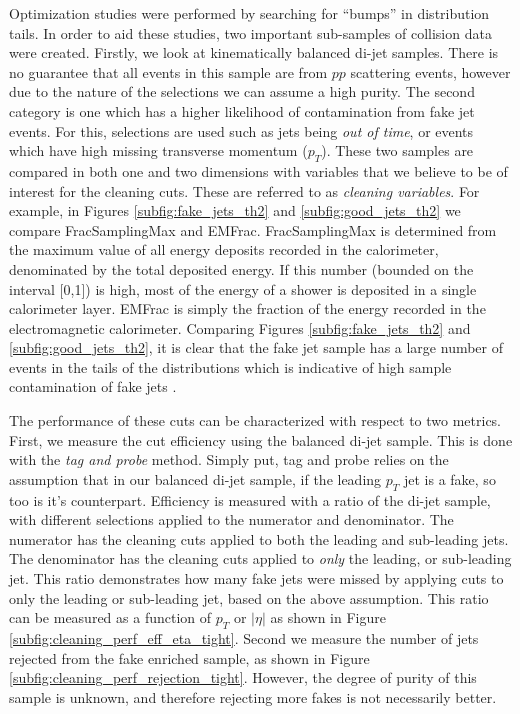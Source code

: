 \documentclass[12pt]{article}
\begin{document}
Optimization studies were performed by searching for ``bumps'' in distribution
tails. In order to aid these studies, two important sub-samples of collision
data were created. Firstly, we look at kinematically balanced di-jet samples.
There is no guarantee that all events in this sample are from $pp$ scattering
events, however due to the nature of the selections we can assume a high purity.
The second category is one which has a higher likelihood of contamination from
fake jet events. For this, selections are used such as jets being \textit{out of
time}, or events which have high missing transverse momentum ($p_T$). These two
samples are compared in both one and two dimensions with variables that we
believe to be of interest for the cleaning cuts. These are referred to as
\textit{cleaning variables}. For example, in Figures \ref{subfig:fake_jets_th2}
and \ref{subfig:good_jets_th2} we compare FracSamplingMax and EMFrac.
FracSamplingMax is determined from the maximum value of all energy deposits
recorded in the calorimeter, denominated by the total deposited energy. If this
number (bounded on the interval [0,1]) is high, most of the energy of a shower
is deposited in a single calorimeter layer. EMFrac is simply the fraction of the
energy recorded in the electromagnetic calorimeter. Comparing Figures
\ref{subfig:fake_jets_th2} and \ref{subfig:good_jets_th2}, it is clear that the
fake jet sample has a large number of events in the tails of the distributions
which is indicative of high sample contamination of fake jets
\cite{jet_cleaning_tancredi}.


The performance of these cuts can be characterized with respect to two metrics.
First, we measure the cut efficiency using the balanced di-jet sample. This is
done with the \textit{tag and probe} method. Simply put, tag and probe relies on
the assumption that in our balanced di-jet sample, if the leading $p_T$ jet is a
fake, so too is it's counterpart. Efficiency is measured with a ratio of the
di-jet sample, with different selections applied to the numerator and
denominator. The numerator has the cleaning cuts applied to both the leading and
sub-leading jets. The denominator has the cleaning cuts applied to \textit{only}
the leading, or sub-leading jet. This ratio demonstrates how many fake jets were
missed by applying cuts to only the leading or sub-leading jet, based on the
above assumption. This ratio can be measured as a function of $p_T$ or $|\eta|$
as shown in Figure \ref{subfig:cleaning_perf_eff_eta_tight}. Second we measure
the number of jets rejected from the fake enriched sample, as shown in Figure
\ref{subfig:cleaning_perf_rejection_tight}. However, the degree of purity of
this sample is unknown, and therefore rejecting more fakes is not necessarily
better.  
\end{document}
